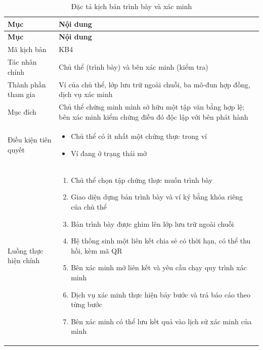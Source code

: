 \begin{longtable}{|p{3.4cm}|p{10.3cm}|}
\caption{Đặc tả kịch bản trình bày và xác minh}
\label{tab:vp-verification-scenario} \\

\hline
\textbf{Mục} & \textbf{Nội dung} \\
\hline
\endfirsthead

\hline
\textbf{Mục} & \textbf{Nội dung} \\
\hline
\endhead

\hline
\endfoot

\hline
\endlastfoot

Mã kịch bản & KB4 \\
\hline

Tác nhân chính & Chủ thể (trình bày) và bên xác minh (kiểm tra) \\
\hline

Thành phần tham gia &
Ví của chủ thể, lớp lưu trữ ngoài chuỗi, ba mô-đun hợp đồng, dịch vụ xác minh \\
\hline

Mục đích &
Chủ thể chứng minh mình sở hữu một tập văn bằng hợp lệ; bên xác minh kiểm chứng điều đó độc lập với bên phát hành \\
\hline

Điều kiện tiên quyết &
\begin{itemize}[leftmargin=*, nosep]
    \item Chủ thể có ít nhất một chứng thực trong ví
    \item Ví đang ở trạng thái mở
\end{itemize} \\
\hline

Luồng thực hiện chính &
\begin{enumerate}[leftmargin=*, nosep]
    \item Chủ thể chọn tập chứng thực muốn trình bày
    \item Giao diện dựng bản trình bày và ví ký bằng khóa riêng của chủ thể
    \item Bản trình bày được ghim lên lớp lưu trữ ngoài chuỗi
    \item Hệ thống sinh một liên kết chia sẻ có thời hạn, có thể thu hồi, kèm mã QR
    \item Bên xác minh mở liên kết và yêu cầu chạy quy trình xác minh
    \item Dịch vụ xác minh thực hiện bảy bước và trả báo cáo theo từng bước
    \item Bên xác minh có thể lưu kết quả vào lịch sử xác minh của mình
\end{enumerate} \\
\hline


\end{longtable}
